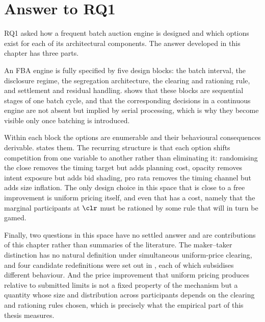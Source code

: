 \section{Answer to RQ1}
\label{sec:rq1answer}

RQ1 asked how a frequent batch auction engine is designed and which
options exist for each of its architectural components. The answer
developed in this chapter has three parts.

An FBA engine is fully specified by five design blocks: the batch
interval, the disclosure regime, the segregation architecture, the
clearing and rationing rule, and settlement and residual handling.
 shows that these blocks are sequential stages of one
batch cycle, and that the corresponding decisions in a continuous engine
are not absent but implied by serial processing, which is why they
become visible only once batching is introduced.

Within each block the options are enumerable and their behavioural
consequences derivable.  states them. The recurring
structure is that each option shifts competition from one variable to
another rather than eliminating it: randomising the close removes the
timing target but adds planning cost, opacity removes intent exposure
but adds bid shading, pro rata removes the timing channel but adds size
inflation. The only design choice in this space that is close to a free
improvement is uniform pricing itself, and even that has a cost, namely
that the marginal participants at $\clr$ must be rationed by some rule
that will in turn be gamed.

Finally, two questions in this space have no settled answer and are
contributions of this chapter rather than summaries of the literature.
The maker--taker distinction has no natural definition under
simultaneous uniform-price clearing, and four candidate redefinitions
were set out in , each of which subsidises
different behaviour. And the price improvement that uniform pricing
produces relative to submitted limits is not a fixed property of the
mechanism but a quantity whose size and distribution across participants
depends on the clearing and rationing rules chosen, which is precisely
what the empirical part of this thesis measures.
